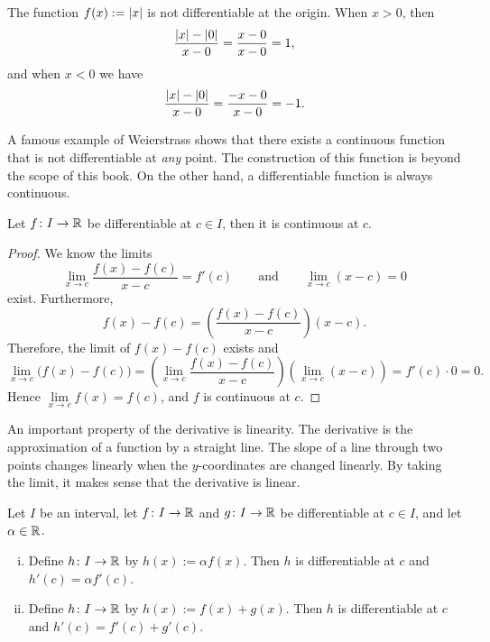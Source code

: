 \begin{example}
The function $f(x) := \left\lvert {x} \right\rvert$ is not differentiable
at the origin.  When $x > 0$, then
\begin{equation*}
\frac{\left\lvert {x} \right\rvert-\left\lvert {0} \right\rvert}{x-0} =
\frac{x-0}{x-0} = 1 ,
\end{equation*}
and when $x < 0$ we have
\begin{equation*}
\frac{\left\lvert {x} \right\rvert-\left\lvert {0} \right\rvert}{x-0} =
\frac{-x-0}{x-0} = -1 .
\end{equation*}
\end{example}

A famous example of Weierstrass shows that there exists a continuous
function that is not differentiable at \emph{any} point.  The construction
of this function is beyond the scope of this book.  On the other hand,
a differentiable function
is always continuous.

\begin{prop}
Let $f \colon I \to {\mathbb{R}}$ be differentiable at $c \in I$,
then it is continuous at $c$.
\end{prop}

\begin{proof}
We know the limits
\begin{equation*}
\lim_{x\to c}\frac{f(x)-f(c)}{x-c} = f'(c)
\qquad
\text{and}
\qquad
\lim_{x\to c}(x-c) = 0
\end{equation*}
exist.  Furthermore,
\begin{equation*}
f(x)-f(c) = 
\left( \frac{f(x)-f(c)}{x-c} \right) (x-c) .
\end{equation*}
Therefore, the limit of $f(x)-f(c)$ exists and
\begin{equation*}
\lim_{x\to c} \bigl( f(x)-f(c) \bigr) =
\left(\lim_{x\to c} \frac{f(x)-f(c)}{x-c} \right)
\left(\lim_{x\to c} (x-c) \right) =
f'(c) \cdot 0  = 0.
\end{equation*}
Hence $\lim\limits_{x\to c} f(x) = f(c)$, and $f$ is continuous at $c$.
\end{proof}

An important property of the derivative is linearity.  The
derivative is the approximation of a function by a straight line.
The slope of a line through two points changes linearly when the
$y$-coordinates are changed linearly.  By taking the limit,
it makes sense that the derivative is linear.

\begin{prop}
Let $I$ be an interval, let
$f \colon I \to {\mathbb{R}}$ and $g \colon I \to {\mathbb{R}}$ be differentiable at $c \in I$,
and let $\alpha \in {\mathbb{R}}$.
\begin{enumerate}[(i)]
\item
Define $h \colon I \to {\mathbb{R}}$ by $h(x) := \alpha f(x)$.  Then
$h$ is differentiable at $c$ and
$h'(c) = \alpha f'(c)$.
\item
Define $h \colon I \to {\mathbb{R}}$ by $h(x) :=  f(x) + g(x)$.  Then
$h$ is differentiable at $c$ and
$h'(c) =  f'(c) + g'(c)$.
\end{enumerate}
\end{prop}

